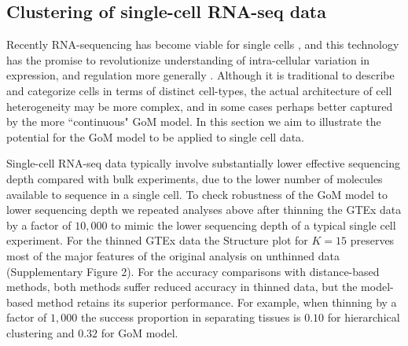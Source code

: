 \subsection{Clustering of single-cell RNA-seq data}

Recently RNA-sequencing has become viable for single cells \cite{Tang2009}, and this technology has the promise to revolutionize understanding of intra-cellular variation in expression, and regulation more generally \cite{Trapnell2015}. Although it is traditional to describe and categorize cells in terms of distinct cell-types, 
the actual architecture of cell heterogeneity may be more complex, and in some cases perhaps better captured by the more ``continuous"  GoM model. 
In this section we aim to illustrate the potential for the GoM model to be applied to single cell data.

Single-cell RNA-seq data typically involve substantially lower effective sequencing depth compared with bulk experiments, due to the lower number of molecules available to sequence in a single cell. To check robustness of the GoM model to lower sequencing depth
 we repeated analyses above after thinning the GTEx data by a factor of $10,000$ to mimic the lower sequencing depth of a typical single cell experiment.
For the thinned GTEx data the Structure plot for $K=15$ preserves most of the major features of the original analysis on unthinned data (Supplementary Figure 2). For the accuracy comparisons with distance-based methods, both methods suffer reduced accuracy in thinned data, but the model-based method retains its superior performance. For example, when thinning by a factor of $1,000$  the success proportion in separating tissues is  $0.10$ for hierarchical clustering and $0.32$ for GoM model.



